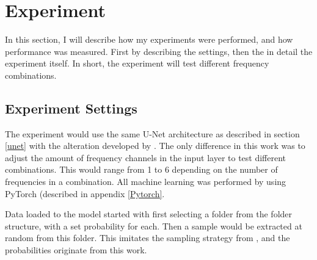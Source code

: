 \section{Experiment} \label{Experiment}
    In this section, I will describe how my experiments were performed, and how performance was measured. First by describing the settings, then the in detail the experiment itself. In short, the experiment will  test different frequency combinations.
    
    \subsection{Experiment Settings} \label{Experiment settings}
        The experiment would use the same U-Net architecture as described in section \ref{unet} with the alteration developed by \citeauthor{brautaset2020acoustic}\cite{brautaset2020acoustic}. The only difference in this work was to adjust the amount of frequency channels in the input layer to test different combinations. This would range from 1 to 6 depending on the number of frequencies in a combination. All machine learning was performed by using PyTorch (described in appendix \ref{Pytorch}.
        
        Data loaded to the model started with first selecting a folder from the folder structure, with a set probability for each. Then a sample would be extracted at random from this folder. This imitates the sampling strategy from \citeauthor{brautaset2020acoustic}\cite{brautaset2020acoustic}, and the probabilities originate from this work.
        
